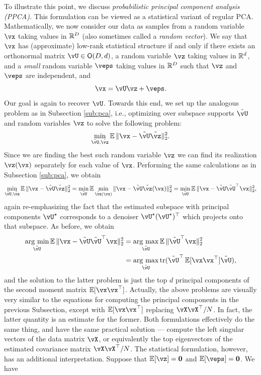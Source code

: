 \documentclass[../../book-main.tex]{subfiles}
\begin{document}
To illustrate this point, we discuss \textit{probabilistic principal component analysis (PPCA).} This formulation can be viewed as a statistical variant of regular PCA. Mathematically, we now consider our data as samples from a random variable \(\vx\) taking values in \(\mathbb{R}^{D}\) (also sometimes called a \textit{random vector}). We say that \(\vx\) has (approximate) low-rank statistical structure if and only if there exists an orthonormal matrix \(\vU \in \O(D, d)\), a random variable \(\vz\) taking values in \(\mathbb{R}^{d}\), and a \textit{small} random variable \(\veps\) taking values in \(\mathbb{R}^{D}\) such that \(\vz\) and \(\veps\) are independent, and
\begin{equation}
    \vx = \vU\vz + \veps.
\end{equation}
Our goal is again to recover \(\vU\). Towards this end, we set up the analogous problem as in Subsection \eqref{sub:pca}, i.e., optimizing over subspace supports \(\tilde{\vU}\) and random variables \(\vz\) to solve the following problem:
\begin{equation}
    \min_{\tilde{\vU}, \tilde{\vz}}\Ex\norm{\vx - \tilde{\vU}\tilde{\vz}}_{2}^{2}.
\end{equation}
Since we are finding the best such random variable \(\vz\) we can find its realization \(\vz(\vx)\) separately for each value of \(\vx\). Performing the same calculations as in Subsection \eqref{sub:pca}, we obtain %
\begin{equation}\label{eq:ppca_denoising}
    \min_{\tilde{\vU}, \tilde{\vz}}\Ex\norm{\vx - \tilde{\vU}\tilde{\vz}}_{2}^{2} = \min_{\tilde{\vU}}\Ex\min_{\tilde{\vz}(\vx)}\norm{\vx - \tilde{\vU}\tilde{\vz}(\vx)}_{2}^{2} = \min_{\tilde{\vU}}\Ex\norm{\vx - \tilde{\vU}\tilde{\vU}^{\top}\vx}_{2}^{2},
\end{equation}
again re-emphasizing the fact that the estimated subspace with principal components \(\vU^{\star}\) corresponds to a denoiser \(\vU^{\star}(\vU^{\star})^{\top}\) which projects onto that subspace. As before, we obtain 
\begin{align}\label{eq:PPCA}
    \argmin_{\tilde{\vU}}\Ex\norm{\vx - \tilde{\vU}\tilde{\vU}^{\top}\vx}_{2}^{2} 
    &= \argmax_{\tilde{\vU}}\Ex\norm{\tilde{\vU}^{\top}\vx}_{2}^{2} \\
    &= \argmax_{\tilde{\vU}}\tr(\tilde{\vU}^{\top}\Ex[\vx\vx^{\top}]\tilde{\vU}),
\end{align}
and the solution to the latter problem is just the top \(d\) principal components of the second moment matrix \(\Ex[\vx\vx^{\top}]\). Actually, the above problems are visually very similar to the equations for computing the principal components in the previous Subsection, except with \(\Ex[\vx\vx^{\top}]\) replacing \(\vX\vX^{\top}/N\). In fact, the latter quantity is an estimate for the former. Both formulations effectively do the same thing, and have the same practical solution --- compute the left singular vectors of the data matrix \(\vX\), or equivalently the top eigenvectors of the estimated covariance matrix \(\vX\vX^{\top}/N\). The statistical formulation, however, has an additional interpretation. Suppose that \(\Ex[\vz] = \vzero\) and \(\Ex[\veps] = \vzero\). We have
\end{document}
